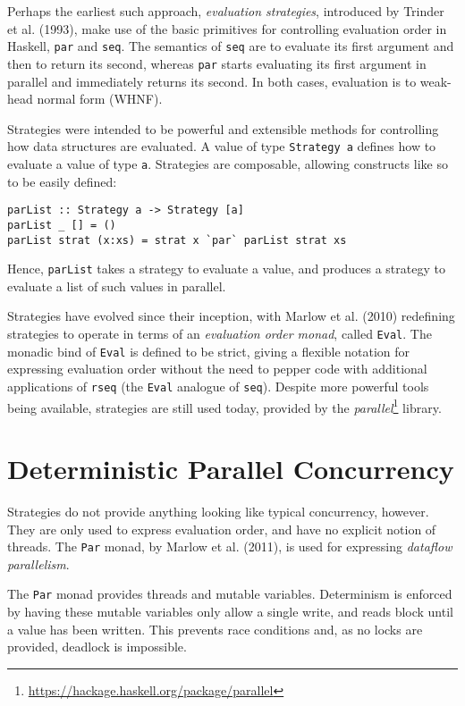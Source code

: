 Perhaps the earliest such approach, \textit{evaluation strategies},
introduced by Trinder et al. (1993)\nocite{trinder}, make use of the
basic primitives for controlling evaluation order in Haskell,
\verb|par| and \verb|seq|. The semantics of \verb|seq| are to evaluate
its first argument and then to return its second, whereas \verb|par|
starts evaluating its first argument in parallel and immediately
returns its second. In both cases, evaluation is to weak-head normal
form (WHNF).

Strategies were intended to be powerful and extensible methods for
controlling how data structures are evaluated. A value of type
\verb|Strategy a| defines how to evaluate a value of type
\verb|a|. Strategies are composable, allowing constructs like so to be
easily defined:

\begin{verbatim}
parList :: Strategy a -> Strategy [a]
parList _ [] = ()
parList strat (x:xs) = strat x `par` parList strat xs
\end{verbatim}

Hence, \verb|parList| takes a strategy to evaluate a value, and
produces a strategy to evaluate a list of such values in
parallel.

Strategies have evolved since their inception, with Marlow et
al. (2010)\nocite{strategies} redefining strategies to operate in
terms of an \textit{evaluation order monad}, called \verb|Eval|. The
monadic bind of \verb|Eval| is defined to be strict, giving a flexible
notation for expressing evaluation order without the need to pepper
code with additional applications of \verb|rseq| (the \verb|Eval|
analogue of \verb|seq|). Despite more powerful tools being available,
strategies are still used today, provided by the
\textit{parallel}\footnote{\url{https://hackage.haskell.org/package/parallel}}
library.

\section{Deterministic Parallel Concurrency}
\label{sec:litrev-det}

Strategies do not provide anything looking like typical concurrency,
however. They are only used to express evaluation order, and have no
explicit notion of threads. The \verb|Par| monad, by Marlow et
al. (2011)\nocite{parmonad}, is used for expressing \textit{dataflow
  parallelism}.

The \verb|Par| monad provides threads and mutable
variables. Determinism is enforced by having these mutable variables
only allow a single write, and reads block until a value has been
written. This prevents race conditions and, as no locks are provided,
deadlock is impossible.

